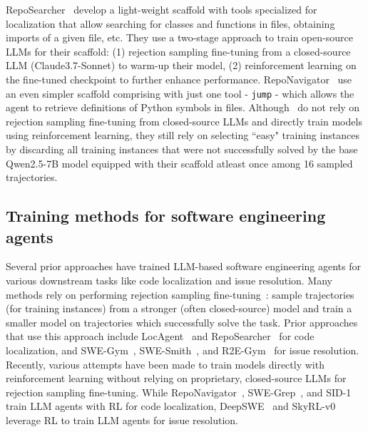 RepoSearcher~\citep{ma2025toolintegratedreinforcementlearningrepo} develop a light-weight scaffold with tools specialized for localization that allow searching for classes and functions in files, obtaining imports of a given file, etc. They use a two-stage approach to train open-source LLMs for their scaffold: (1) rejection sampling fine-tuning from a closed-source LLM (Claude3.7-Sonnet) to warm-up their model, (2) reinforcement learning on the fine-tuned checkpoint to further enhance performance. RepoNavigator~\citep{zhang2025one} use an even simpler scaffold comprising with just one tool - \texttt{jump} - which allows the agent to retrieve definitions of Python symbols in files. Although~\citet{zhang2025one} do not rely on rejection sampling fine-tuning from closed-source LLMs and directly train models using reinforcement learning, they still rely on selecting ``easy" training instances by discarding all training instances that were not successfully solved by the base Qwen2.5-7B model equipped with their scaffold atleast once among 16 sampled trajectories. 

\subsection{Training methods for software engineering agents}
Several prior approaches have trained LLM-based software engineering agents for various downstream tasks like code localization and issue resolution. Many methods rely on performing rejection sampling fine-tuning~\citep{yuan2023scalingrelationshiplearningmathematical}: sample trajectories (for training instances) from a stronger (often closed-source) model and train a smaller model on trajectories which successfully solve the task. Prior approaches that use this approach include LocAgent~\citep{chen-etal-2025-locagent} and RepoSearcher~\citep{ma2025toolintegratedreinforcementlearningrepo} for code localization, and SWE-Gym~\citep{pan2025trainingsoftwareengineeringagents}, SWE-Smith~\citep{yang2025swesmithscalingdatasoftware}, and R2E-Gym~\citep{jain2025r2egymproceduralenvironmentshybrid} for issue resolution. Recently, various attempts have been made to train models directly with reinforcement learning without relying on proprietary, closed-source LLMs for rejection sampling fine-tuning. While RepoNavigator~\citep{zhang2025one}, SWE-Grep~\citep{cognition2025swegrep}, and SID-1~\citep{sid2025preview} train LLM agents with RL for code localization, DeepSWE~\citep{luo2025deepswe} and SkyRL-v0~\citep{cao2025skyrl} leverage RL to train LLM agents for issue resolution.

